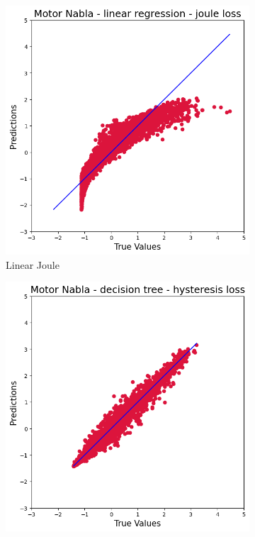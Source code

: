 \documentclass{article}
\begin{document}
\begin{figure}[!htbp]
\begin{subfigure}[b]{0.23\textwidth}
        \includegraphics[width=\textwidth]{images/Nabla/linear_joule.png}
        \caption{Linear Joule}
    \end{subfigure}
    \hfill
    \begin{subfigure}[b]{0.23\textwidth}
        \centering
        \includegraphics[width=\textwidth]{images/Nabla/reg_tree_hysteresis.png}

\end{subfigure}
\end{figure}
\end{document}
